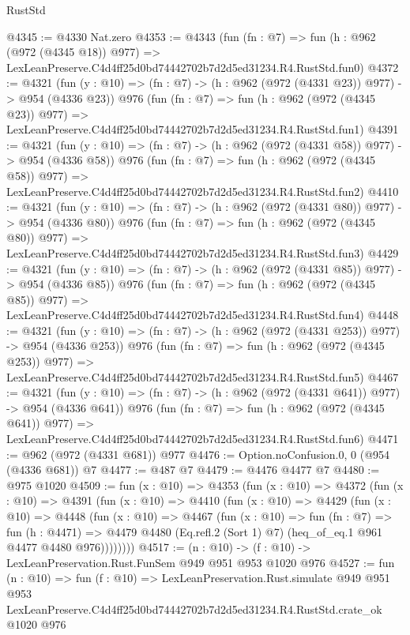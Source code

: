 \begin{lexlean}{RustStd}
\begin{coremodule}
@4345 := @4330 Nat.zero
@4353 := @4343
    (fun (fn : @7) =>
    fun (h : @962 (@972 (@4345 @18)) @977) =>
    LexLeanPreserve.C4d4ff25d0bd74442702b7d2d5ed31234.R4.RustStd.fun0)
@4372 := @4321
    (fun (y : @10) => (fn : @7) -> (h : @962 (@972 (@4331 @23)) @977) -> @954 (@4336 @23))
    @976
    (fun (fn : @7) =>
    fun (h : @962 (@972 (@4345 @23)) @977) =>
    LexLeanPreserve.C4d4ff25d0bd74442702b7d2d5ed31234.R4.RustStd.fun1)
@4391 := @4321
    (fun (y : @10) => (fn : @7) -> (h : @962 (@972 (@4331 @58)) @977) -> @954 (@4336 @58))
    @976
    (fun (fn : @7) =>
    fun (h : @962 (@972 (@4345 @58)) @977) =>
    LexLeanPreserve.C4d4ff25d0bd74442702b7d2d5ed31234.R4.RustStd.fun2)
@4410 := @4321
    (fun (y : @10) => (fn : @7) -> (h : @962 (@972 (@4331 @80)) @977) -> @954 (@4336 @80))
    @976
    (fun (fn : @7) =>
    fun (h : @962 (@972 (@4345 @80)) @977) =>
    LexLeanPreserve.C4d4ff25d0bd74442702b7d2d5ed31234.R4.RustStd.fun3)
@4429 := @4321
    (fun (y : @10) => (fn : @7) -> (h : @962 (@972 (@4331 @85)) @977) -> @954 (@4336 @85))
    @976
    (fun (fn : @7) =>
    fun (h : @962 (@972 (@4345 @85)) @977) =>
    LexLeanPreserve.C4d4ff25d0bd74442702b7d2d5ed31234.R4.RustStd.fun4)
@4448 := @4321
    (fun (y : @10) => (fn : @7) -> (h : @962 (@972 (@4331 @253)) @977) -> @954 (@4336 @253))
    @976
    (fun (fn : @7) =>
    fun (h : @962 (@972 (@4345 @253)) @977) =>
    LexLeanPreserve.C4d4ff25d0bd74442702b7d2d5ed31234.R4.RustStd.fun5)
@4467 := @4321
    (fun (y : @10) => (fn : @7) -> (h : @962 (@972 (@4331 @641)) @977) -> @954 (@4336 @641))
    @976
    (fun (fn : @7) =>
    fun (h : @962 (@972 (@4345 @641)) @977) =>
    LexLeanPreserve.C4d4ff25d0bd74442702b7d2d5ed31234.R4.RustStd.fun6)
@4471 := @962 (@972 (@4331 @681)) @977
@4476 := Option.noConfusion.{0, 0} (@954 (@4336 @681)) @7
@4477 := @487 @7
@4479 := @4476 @4477 @7
@4480 := @975 @1020
@4509 := fun (x : @10) =>
  @4353
    (fun (x : @10) =>
    @4372
      (fun (x : @10) =>
      @4391
        (fun (x : @10) =>
        @4410
          (fun (x : @10) =>
          @4429
            (fun (x : @10) =>
            @4448
              (fun (x : @10) =>
              @4467
                (fun (x : @10) =>
                fun (fn : @7) =>
                fun (h : @4471) =>
                @4479 @4480 (Eq.refl.{2} (Sort 1) @7) (heq_of_eq.{1} @961 @4477 @4480 @976))))))))
@4517 := (n : @10) -> (f : @10) -> LexLeanPreservation.Rust.FunSem @949 @951 @953 @1020 @976
@4527 := fun (n : @10) =>
  fun (f : @10) =>
  LexLeanPreservation.Rust.simulate
    @949
    @951
    @953
    LexLeanPreserve.C4d4ff25d0bd74442702b7d2d5ed31234.R4.RustStd.crate_ok
    @1020
    @976
\end{coremodule}
\end{lexlean}
